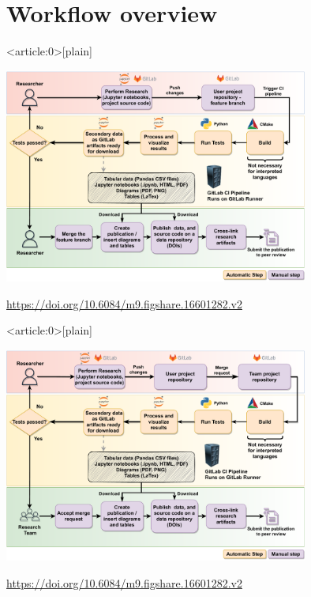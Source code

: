 \section{Workflow overview}


{ %
    \begin{frame}<article:0>[plain]
        \vfill

        \begin{center}
            \includegraphics[width=0.75\textwidth]{figures/ZINF-CI-diagram-individual.drawio.pdf}
        \end{center}
        {\tiny \href{https://doi.org/10.6084/m9.figshare.16601282.v2}
        {https://doi.org/10.6084/m9.figshare.16601282.v2}}
     \end{frame}
}

{ %
    \begin{frame}<article:0>[plain]
        \vfill

        \begin{center}
        \includegraphics[width=0.75\textwidth]{figures/ZINF-CI-diagram.drawio.pdf}
        \end{center}
        {\tiny \href{https://doi.org/10.6084/m9.figshare.16601282.v2}
        {https://doi.org/10.6084/m9.figshare.16601282.v2}}
     \end{frame}
}

